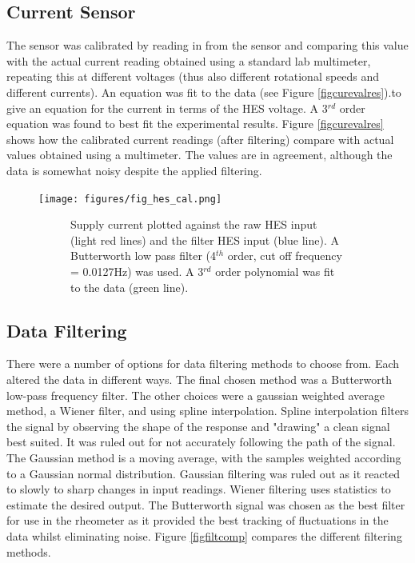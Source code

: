 \documentclass[twoside,a4]{report}
\def\br{\newline \newline \noindent}
\begin{document}
	\subsection*{Current Sensor} %
	The sensor was calibrated by reading in from the sensor and comparing this value with the actual current reading obtained using a standard lab multimeter, repeating this at different voltages (thus also different rotational speeds and different currents). An equation was fit to the data (see Figure \ref{figcurevalres}).to give an equation for the current in terms of the HES voltage. A 3$^{rd}$ order equation was found to best fit the experimental results.\br
	Figure \ref{figcurevalres} shows how the calibrated current readings (after filtering) compare with actual values obtained using a multimeter. The values are in agreement, although the data is somewhat noisy despite the applied filtering.
	
	\begin{figure}[!htb]
		\centering
		\texttt{[image: figures/fig\_hes\_cal.png]}
		\caption{Current Sensor Evaluation Results}
		\label{figcurevalres}
		\begin{subfigure}{0.9\textwidth}
			\footnotesize Supply current plotted against the raw HES input (light red lines) and the filter HES input (blue line). A Butterworth low pass filter (4$^{th}$ order, cut off frequency = 0.0127Hz) was used. A 3$^{rd}$ order polynomial was fit to the data (green line).
		\end{subfigure}
	\end{figure}
	
	\subsection*{Data Filtering}
	There were a number of options for data filtering methods to choose from. Each altered the data in different ways. The final chosen method was a Butterworth low-pass frequency filter. The other choices were a gaussian weighted average method, a Wiener filter, and using spline interpolation. Spline interpolation filters the signal by observing the shape of the response and "drawing" a clean signal best suited. It was ruled out for not accurately following the path of the signal. The Gaussian method is a moving average, with the samples weighted according to a Gaussian normal distribution. Gaussian filtering was ruled out as it reacted to slowly to sharp changes in input readings. Wiener filtering uses statistics to estimate the desired output. The Butterworth signal was chosen as the best filter for use in the rheometer as it provided the best tracking of fluctuations in the data whilst eliminating noise. Figure \ref{figfiltcomp} compares the different filtering methods.\\
	
\end{document}

